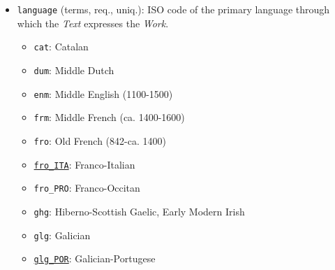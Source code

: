 \begin{itemize}
\begin{multicols}{2}
\begin{itemize}
\begin{itemize}
                    \item \texttt{ridderepiek}
                    \item \texttt{ridderroman}
                    \item \texttt{rijmkronieken}
                    \item {}
                \end{itemize}
            \item Relevant to Middle English, Middle Irish, Middle Welsh traditions
            \begin{itemize}
                \item \texttt{romance}
                \item {}
            \end{itemize}
            \item Relevant to Middle High German tradition
            \begin{itemize}
                \item {}
            \end{itemize}
        \end{itemize}
    \end{multicols}
    \item \texttt{language} (terms, req., uniq.): ISO code of the primary language through which the \textit{Text} expresses the \textit{Work}.
    \begin{multicols}{2}
        \begin{itemize}
            \item \texttt{cat}: Catalan
            \item \texttt{dum}: Middle Dutch
            \item \texttt{enm}: Middle English (1100-1500)
            \item \texttt{frm}: Middle French (ca. 1400-1600)
            \item \texttt{fro}: Old French (842-ca. 1400)
            \item \href{https://www.wikidata.org/wiki/Q54879035}{\texttt{fro\_ITA}}: Franco-Italian
            \item \texttt{fro\_PRO}: Franco-Occitan
            \item \texttt{ghg}: Hiberno-Scottish Gaelic, Early Modern Irish
            \item \texttt{glg}: Galician
            \item \href{https://www.wikidata.org/wiki/Q1072111}{\texttt{glg\_POR}}: Galician-Portugese

\end{itemize}
\end{multicols}
\end{itemize}
